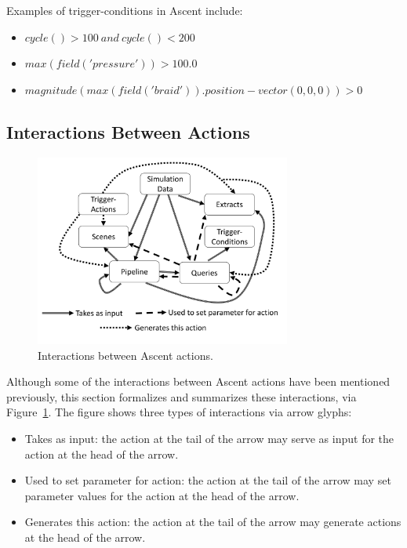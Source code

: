 Examples of trigger-conditions in Ascent include:
\begin{itemize}
\item $cycle() > 100 \ and \ cycle() < 200$
\item $max(field('pressure')) > 100.0$
\item $magnitude(max(field('braid')).position - vector(0,0,0)) > 0$
\end{itemize}

\subsection{Interactions Between Actions}

\begin{figure}
\centering
\includegraphics[width=0.75\textwidth]{images/ascent_interactions}
\caption{\label{fig:interactions} Interactions between Ascent actions.}
\end{figure}

Although some of the interactions between Ascent actions have been mentioned previously,
this section formalizes and summarizes these interactions, via Figure~\ref{fig:interactions}.
%
The figure shows three types of interactions via arrow glyphs:
%
\begin{itemize}
\item Takes as input: the action at the tail of the arrow may serve as input for the action at the head of the arrow.
\item Used to set parameter for action: the action at the tail of the arrow may set parameter values for the action at the head of the arrow.
\item Generates this action: the action at the tail of the arrow may generate actions at the head of the arrow.
\end{itemize}

